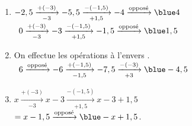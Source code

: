    \ \\ [-5mm]
   \begin{enumerate}
      \item $-2,5 \xrightarrow[-3]{+(-3)} -5,5 \xrightarrow[+1,5]{-(-1,5)} -4 \xrightarrow{\text{opposé}} {\blue 4}$ \\ [1mm]
         \quad\, $0 \xrightarrow[-3]{+(-3)} -3 \xrightarrow[+1,5]{-(-1,5)} -1,5 \xrightarrow{\text{opposé}} {\blue 1,5}$ \\ [1mm]
      \item On effectue les opérations \og à l'envers \fg. \\ [1mm]
         \quad\, $6 \xrightarrow{\text{opposé}} -6 \xrightarrow[-1,5]{+(-1,5)} -7,5  \xrightarrow[+3]{-(-3)}{\blue -4,5}$ \\ [1mm]
      \item $x \xrightarrow[-3]{+(-3)} x-3 \xrightarrow[+1,5]{-(-1,5)} x-3+1,5$ \\
         \quad\; $=x-1,5 \xrightarrow{\text{opposé}}{\blue -x+1,5}$. \\ [1mm]
   \end{enumerate}
